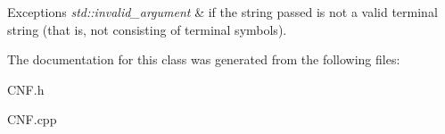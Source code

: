 \begin{DoxyExceptions}{Exceptions}
{\em std\-::invalid\-\_\-argument} & if the string passed is not a valid terminal string (that is, not consisting of terminal symbols). \\
\hline
\end{DoxyExceptions}


The documentation for this class was generated from the following files\-:\begin{DoxyCompactItemize}
\item 
C\-N\-F.\-h\item 
C\-N\-F.\-cpp\end{DoxyCompactItemize}
